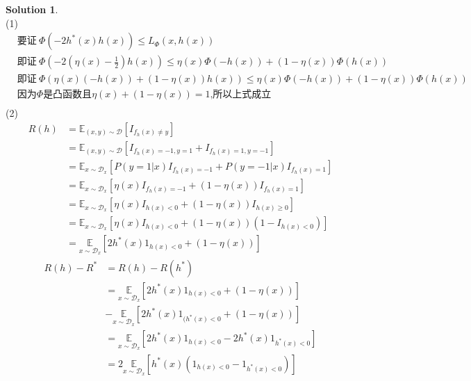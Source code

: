 \documentclass[a4paper,UTF8]{article}
\theoremstyle{definition}
\newtheorem*{solution}{Solution}
\begin{document}
\begin{solution}\ \\
(1)
\begin{equation*}
	\begin{split}
		&\text{要证}\ \Phi\left(-2 h^{*}(x) h(x)\right)\leq L_{\Phi}(x, h(x))\\
		&\text{即证}\ \Phi\left(-2(\eta(x)-\frac{1}{2})h(x)\right) \le \eta(x)\Phi(-h(x)) + (1-\eta(x))\Phi(h(x))\\
		&\text{即证}\ \Phi(\eta(x)(-h(x))+(1-\eta(x))h(x)) \le \eta(x)\Phi(-h(x)) + (1-\eta(x))\Phi(h(x))\\
		&\text{因为}\Phi\text{是凸函数且}\eta(x)+(1-\eta(x))=1\text{,所以上式成立}\\
	\end{split}
\end{equation*}
(2)
\begin{equation*}
	\begin{split}
		R(h)&=\mathbb{E}_{(x, y) \sim \mathcal{D}}\left[I_{f_{h}(x) \neq y}\right]\\
		&=\mathbb{E}_{(x, y) \sim \mathcal{D}}\left[I_{f_{h}(x)=-1 , y=1}+I_{f_{h}(x)=1 , y=-1}\right]\\
		&=\mathbb{E}_{x\sim \mathcal{D}_x}\left[P(y=1|x)I_{f_h(x)=-1} +P(y=-1|x)I_{f_h(x)=1}\right]\\
		&=\mathbb{E}_{x\sim \mathcal{D}_x}\left[\eta(x)I_{f_h(x)=-1} +(1-\eta(x))I_{f_h(x)=1}\right]\\
		&=\mathbb{E}_{x\sim \mathcal{D}_x}\left[\eta(x)I_{h(x)<0} + (1-\eta(x))I_{h(x)\ge 0}\right]\\
		&=\mathbb{E}_{x\sim \mathcal{D}_x}\left[\eta(x)I_{h(x)<0} + (1-\eta(x))(1 - I_{h(x)< 0})\right]\\
		&=\underset{x \sim \mathcal{D}_{x}}{\mathbb{E}}\left[2 h^{*}(x) 1_{h(x)<0}+(1-\eta(x))\right]
	\end{split}
\end{equation*}
\begin{equation*}
	\begin{split}
		R(h)-R^* &= R(h)-R(h^*)\\
		&=\underset{x \sim \mathcal{D}_{x}}{\mathbb{E}}\left[2 h^{*}(x) 1_{h(x)<0}+(1-\eta(x))\right]\\
		&-\underset{x \sim \mathcal{D}_{x}}{\mathbb{E}}\left[2 h^{*}(x) 1_{(h^*(x)<0}+(1-\eta(x))\right]\\
		&=\underset{x \sim \mathcal{D}_{x}}{\mathbb{E}}\left[2 h^{*}(x) 1_{h(x)<0}-2 h^{*}(x) 1_{h^*(x)<0}\right]\\
		&=2\underset{x \sim \mathcal{D}_{x}}{\mathbb{E}}\left[h^{*}(x) (1_{h(x)<0}-1_{h^*(x)<0})\right]\\

\end{split}
\end{equation*}
\end{solution}
\end{document}
